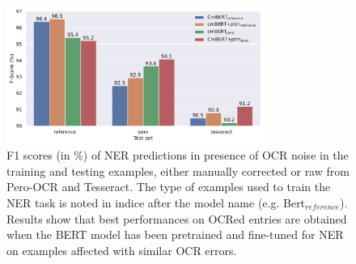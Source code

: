 \begin{figure}
    \centering
    \includegraphics[width=0.75\textwidth]{images/experiment_2_f1_with_noise_graph.pdf}
    \caption{F1 scores (in \%) of NER predictions in presence of OCR noise in the training and testing examples, either manually corrected or raw from Pero-OCR and Tesseract. The type of examples used to train the NER task is noted in indice after the model name (e.g. Bert$_{reference}$). Results show that best performances on OCRed entries are obtained when the BERT model has been pretrained and fine-tuned for NER on examples affected with similar OCR errors.}
    \label{fig:exp_2_eval_ner}
\end{figure}

